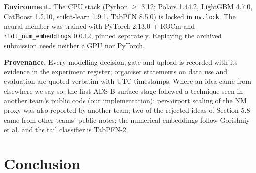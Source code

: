 \documentclass[
  manuscript=article,  %
  layout=preprint,     %
  year=2026,
  volume=4,
]{extra/joas}
\begin{document}
\textbf{Environment.} The CPU stack (Python $\ge$ 3.12; Polars 1.44.2, LightGBM 4.7.0, CatBoost 1.2.10, scikit-learn 1.9.1, TabPFN 8.5.0) is locked in \texttt{uv.lock}. The neural member was trained with PyTorch 2.13.0 + ROCm and \texttt{rtdl\_\allowbreak{}num\_\allowbreak{}embeddings} 0.0.12, pinned separately. Replaying the archived submission needs neither a GPU nor PyTorch.

\textbf{Provenance.} Every modelling decision, gate and upload is recorded with its evidence in the experiment register; organiser statements on data use and evaluation are quoted verbatim with UTC timestamps. Where an idea came from elsewhere we say so: the first ADS-B surface stage followed a technique seen in another team's public code (our implementation); per-airport scaling of the NM proxy was also reported by another team; two of the rejected ideas of Section 5.8 came from other teams' public notes; the numerical embeddings follow Gorishniy et al. \autocite{gorishniy2022embeddings} and the tail classifier is TabPFN-2 \autocite{hollmann2025tabpfn}.

\section{Conclusion}\label{conclusion}
\end{document}
